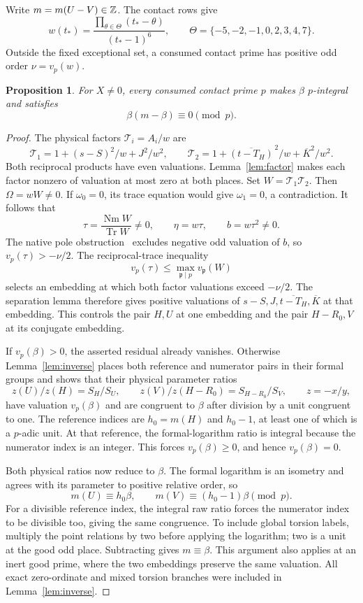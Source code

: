 \documentclass[11pt,a4paper]{article}
\newtheorem{proposition}[theorem]{Proposition}
\DeclareMathOperator{\Tr}{Tr}\DeclareMathOperator{\Nm}{Nm}
\begin{document}
Write $m=m(U-V)\in\mathbb Z$. The contact rows give
\[
 w(t_*)=\frac{\prod_{\theta\in\Theta}(t_*-\theta)}{(t_*-1)^6},
 \qquad \Theta=\{-5,-2,-1,0,2,3,4,7\}.
\]
Outside the fixed exceptional set, a consumed contact prime has
positive odd order $\nu=v_p(w)$.

\begin{proposition}\label{prop:local}
For $X\ne0$, every consumed contact prime $p$ makes $\beta$
$p$-integral and satisfies
\[
                            \beta(m-\beta)\equiv0\pmod p.
\]
\end{proposition}
\begin{proof}
The physical factors $\mathcal T_i=A_i/w$ are
\[
 \mathcal T_1=1+(s-S)^2/w+J^2/w^2,\qquad
 \mathcal T_2=1+\overline{(t-T_H)}^{\,2}/w+\overline K^2/w^2.
\]
Both reciprocal products have even valuations.
Lemma~\ref{lem:factor} makes each factor nonzero of valuation at
most zero at both places. Set $W=\mathcal T_1\mathcal T_2$.
Then $\Omega=wW\ne0$. If $\omega_0=0$, its trace equation would
give $\omega_1=0$, a contradiction. It follows that
\begin{equation}\label{eq:physical}
 \tau=\frac{\Nm W}{\Tr W}\ne0,\qquad
                         \eta=w\tau,\qquad b=w\tau^2\ne0.
\end{equation}
The native pole obstruction~\cite{Pole} excludes negative odd
valuation of $b$, so $v_p(\tau)>-\nu/2$. The reciprocal-trace
inequality
\[
 v_p(\tau)\le\max_{\mathfrak p\mid p}v_{\mathfrak p}(W)
\]
selects an embedding at which both factor valuations exceed
$-\nu/2$. The separation lemma therefore gives positive valuations
of $s-S,J,\overline{t-T_H},\overline K$ at that embedding.
This controls the pair $H,U$ at one embedding and the pair
$H-R_0,V$ at its conjugate embedding.

If $v_p(\beta)>0$, the asserted residual already vanishes.
Otherwise Lemma~\ref{lem:inverse} places both reference and
numerator pairs in their formal groups and shows that their
physical parameter ratios
\[
             z(U)/z(H)=S_H/S_U,\qquad
             z(V)/z(H-R_0)=S_{H-R_0}/S_V,\qquad z=-x/y,
\]
have valuation $v_p(\beta)$ and are congruent to $\beta$ after
division by a unit congruent to one. The reference indices are
$h_0=m(H)$ and $h_0-1$, at least one of which is a $p$-adic unit.
At that reference, the formal-logarithm ratio is integral because
the numerator index is an integer. This forces $v_p(\beta)\ge0$,
and hence $v_p(\beta)=0$.

Both physical ratios now reduce to $\beta$. The formal logarithm
is an isometry and agrees with its parameter to positive relative
order, so
\[
 m(U)\equiv h_0\beta,\qquad m(V)\equiv(h_0-1)\beta\pmod p.
\]
For a divisible reference index, the integral raw ratio forces
the numerator index to be divisible too, giving the same congruence.
To include global torsion labels, multiply the point relations by
two before applying the logarithm; two is a unit at the good odd
place. Subtracting gives $m\equiv\beta$. This argument also applies
at an inert good prime, where the two embeddings preserve the
same valuation. All exact zero-ordinate and mixed torsion branches
were included in Lemma~\ref{lem:inverse}.
\end{proof}
\end{document}
